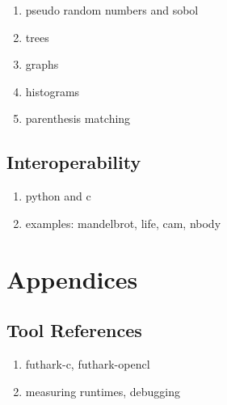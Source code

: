 \documentclass[oneside,11pt]{book}
\begin{document}
\begin{enumerate}
\item pseudo random numbers and sobol
\item trees
\item graphs
\item histograms
\item parenthesis matching
\end{enumerate}


\chapter{Interoperability}
\label{chap:interoperability}

\begin{enumerate}
\item python and c
\item examples: mandelbrot, life, cam, nbody
\end{enumerate}




\appendix

\part{Appendices}

\chapter{Tool References}
\begin{enumerate}
\item futhark-c, futhark-opencl
\item measuring runtimes, debugging
\end{enumerate}
\end{document}
